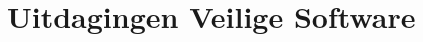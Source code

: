 \documentclass[main.tex]{subfiles}
\begin{document}
\chapter{Uitdagingen Veilige Software}
\end{document}
